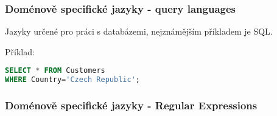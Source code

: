 \begin{frame}[fragile]
    \frametitle{Doménově specifické jazyky - query languages}
    Jazyky určené pro práci s databázemi, nejznámějším příkladem je SQL.

Příklad:

    \begin{lstlisting}[language=SQL]
SELECT * FROM Customers
WHERE Country='Czech Republic'; 
    \end{lstlisting}
    
    
\end{frame}

\begin{frame}
    \frametitle{Doménově specifické jazyky - Regular Expressions}


\end{frame}